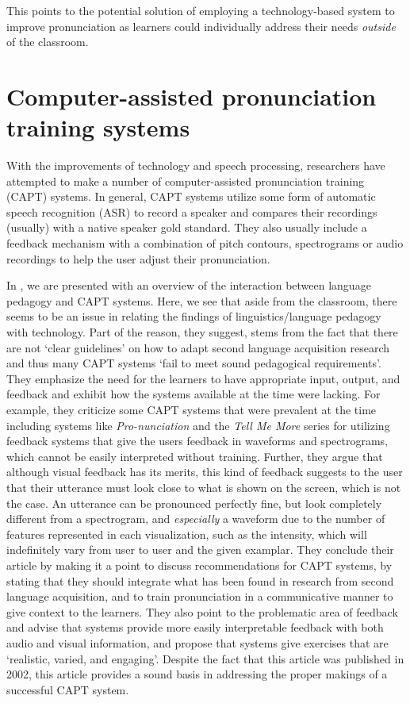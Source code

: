 \documentclass
[
    a4paper,
    twoside,
    12pt
]
{report}
\begin{document}
This points to the potential solution of employing a technology-based
system to improve pronunciation as learners could individually address
their needs \textit{outside} of the classroom.

\hypertarget{computer-assisted-pronunciation-training-systems}{%
\section{Computer-assisted pronunciation training
systems}\label{computer-assisted-pronunciation-training-systems}}

\label{sec:capt} With the improvements of technology and speech
processing, researchers have attempted to make a number of
computer-assisted pronunciation training (CAPT) systems. In general,
CAPT systems utilize some form of automatic speech recognition (ASR) to
record a speaker and compares their recordings (usually) with a native
speaker gold standard. They also usually include a feedback mechanism
with a combination of pitch contours, spectrograms or audio recordings
to help the user adjust their pronunciation.

In \textcite{neri2002}, we are presented with an overview of the
interaction between language pedagogy and CAPT systems. Here, we see
that aside from the classroom, there seems to be an issue in relating
the findings of linguistics/language pedagogy with technology. Part of
the reason, they suggest, stems from the fact that there are not `clear
guidelines' on how to adapt second language acquisition research and
thus many CAPT systems `fail to meet sound pedagogical requirements'.
They emphasize the need for the learners to have appropriate input,
output, and feedback and exhibit how the systems available at the time
were lacking. For example, they criticize some CAPT systems that were
prevalent at the time including systems like \textit{Pro-nunciation} and
the \textit{Tell Me More} series for utilizing feedback systems that
give the users feedback in waveforms and spectrograms, which cannot be
easily interpreted without training. Further, they argue that although
visual feedback has its merits, this kind of feedback suggests to the
user that their utterance must look close to what is shown on the
screen, which is not the case. An utterance can be pronounced perfectly
fine, but look completely different from a spectrogram, and
\textit{especially} a waveform due to the number of features represented
in each visualization, such as the intensity, which will indefinitely
vary from user to user and the given examplar. They conclude their
article by making it a point to discuss recommendations for CAPT
systems, by stating that they should integrate what has been found in
research from second language acquisition, and to train pronunciation in
a communicative manner to give context to the learners. They also point
to the problematic area of feedback and advise that systems provide more
easily interpretable feedback with both audio and visual information,
and propose that systems give exercises that are `realistic, varied, and
engaging'. Despite the fact that this article was published in 2002,
this article provides a sound basis in addressing the proper makings of
a successful CAPT system.
\end{document}
